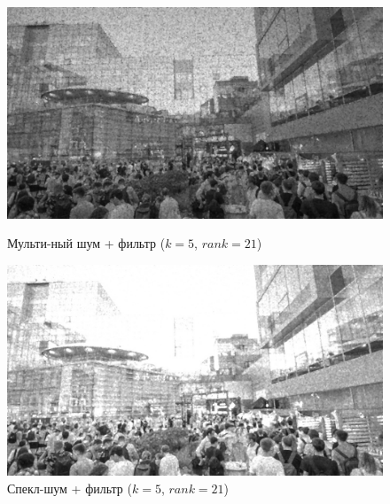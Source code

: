 \documentclass[a4paper]{article}
\begin{document}
\begin{figure}[H]
    \begin{minipage}{0.49\textwidth}
        \centering \includegraphics[width=\textwidth]{images/3_nonlinear_filters/multiplicative - rang (k=5, rank=21).jpg}
        \caption{Мульти-ный шум + фильтр ($k = 5$, $rank = 21$)}
    \end{minipage}\hfill
    \begin{minipage}{0.49\textwidth}
        \centering \includegraphics[width=\textwidth]{images/3_nonlinear_filters/speckle - rang (k=5, rank=21).jpg}
        \caption{Спекл-шум + фильтр ($k = 5$, $rank = 21$)}
    \end{minipage}
\end{figure}
\end{document}
